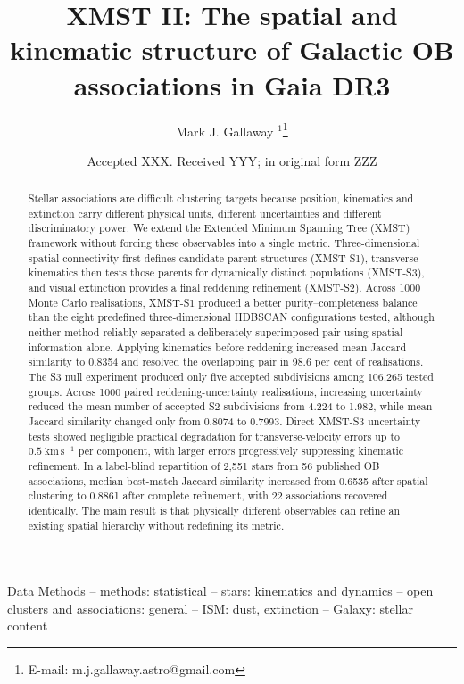 \documentclass[fleqn,usenatbib]{rasti}
\title[XMST II: Galactic OB associations]{XMST II: The spatial and kinematic structure of Galactic OB associations in Gaia DR3}
\author[M. J. Gallaway]{
Mark J. Gallaway $^{1}$\thanks{E-mail: m.j.gallaway.astro@gmail.com}
\\
}
\date{Accepted XXX. Received YYY; in original form ZZZ}
\begin{document}
\label{firstpage}
\pagerange{\pageref{firstpage}--\pageref{lastpage}}
\maketitle

\begin{abstract}
Stellar associations are difficult clustering targets because position, kinematics and extinction carry different physical units, different uncertainties and different discriminatory power. We extend the Extended Minimum Spanning Tree (XMST) framework without forcing these observables into a single metric. Three-dimensional spatial connectivity first defines candidate parent structures (XMST-S1), transverse kinematics then tests those parents for dynamically distinct populations (XMST-S3), and visual extinction provides a final reddening refinement (XMST-S2). Across 1000 Monte Carlo realisations, XMST-S1 produced a better purity--completeness balance than the eight predefined three-dimensional HDBSCAN configurations tested, although neither method reliably separated a deliberately superimposed pair using spatial information alone. Applying kinematics before reddening increased mean Jaccard similarity to 0.8354 and resolved the overlapping pair in 98.6 per cent of realisations. The S3 null experiment produced only five accepted subdivisions among 106,265 tested groups. Across 1000 paired reddening-uncertainty realisations, increasing uncertainty reduced the mean number of accepted S2 subdivisions from 4.224 to 1.982, while mean Jaccard similarity changed only from 0.8074 to 0.7993. Direct XMST-S3 uncertainty tests showed negligible practical degradation for transverse-velocity errors up to $0.5~\mathrm{km\,s^{-1}}$ per component, with larger errors progressively suppressing kinematic refinement. In a label-blind repartition of 2,551 stars from 56 published OB associations, median best-match Jaccard similarity increased from 0.6535 after spatial clustering to 0.8861 after complete refinement, with 22 associations recovered identically. The main result is that physically different observables can refine an existing spatial hierarchy without redefining its metric.
\end{abstract}

\begin{keywords}
Data Methods -- methods: statistical -- stars: kinematics and dynamics -- open clusters and associations: general -- ISM: dust, extinction -- Galaxy: stellar content
\end{keywords}
\end{document}
